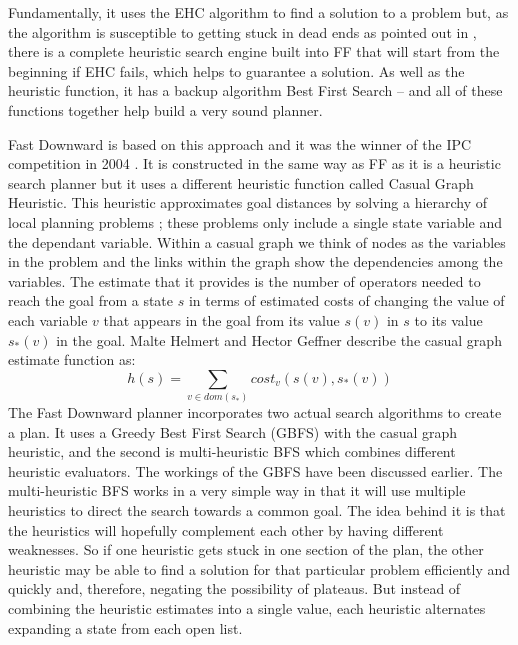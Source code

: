 Fundamentally, it uses the EHC algorithm to find a solution to a problem but, as the algorithm is susceptible to getting stuck in dead ends as pointed out in \cite{FFPlanner}, there is a complete heuristic search engine built into FF that will start from the beginning if EHC fails, which helps to guarantee a solution. As well as the heuristic function, it has a backup algorithm Best First Search – and all of these functions together help build a very sound planner.  

Fast Downward is based on this approach and it was the winner of the IPC competition in 2004 \cite{IPC2004W}. It is constructed in the same way as FF as it is a heuristic search planner but it uses a different heuristic function called Casual Graph Heuristic. This heuristic approximates goal distances by solving a hierarchy of local planning problems \cite{CasualGraph}; these problems only include a single state variable and the dependant variable. Within a casual graph we think of nodes as the variables in the problem and the links within the graph show the dependencies among the variables. The estimate that it provides is the number of operators needed to reach the goal from a state $s$ in terms of estimated costs of changing the value of each variable $v$ that appears in the goal from its value $s(v)$ in $s$ to its value $s_*(v)$ in the goal.\cite{CasualGraph}
Malte Helmert and Hector Geffner describe the casual graph estimate function as:
\begin{equation}
h(s) = \sum_{v\in dom(s_*)} cost_v(s(v), s_*(v))
\end{equation}
The Fast Downward planner incorporates two actual search algorithms to create a plan. It uses a Greedy Best First Search (GBFS) with the casual graph heuristic, and the second is multi-heuristic BFS which combines different heuristic evaluators. The workings of the GBFS have been discussed earlier.
The multi-heuristic BFS works in a very simple way in that it will use multiple heuristics to direct the search towards a common goal. The idea behind it is that the heuristics will hopefully complement each other by having different weaknesses. So if one heuristic gets stuck in one section of the plan, the other heuristic may be able to find a solution for that particular problem efficiently and quickly and, therefore, negating the possibility of plateaus. But instead of combining the heuristic estimates into a single value, each heuristic alternates expanding a state from each open list.\cite{FastDownward}

